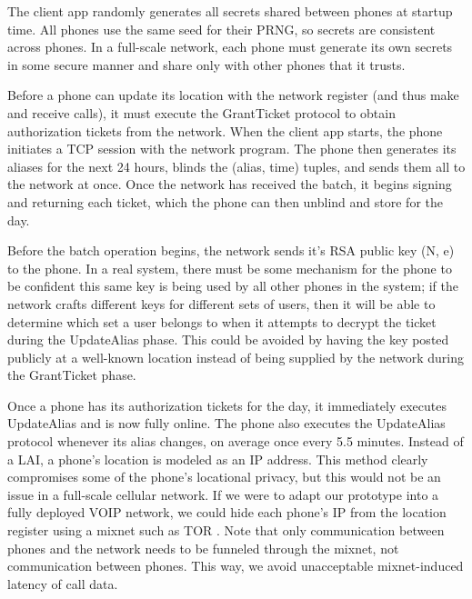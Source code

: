\documentclass[11pt]{article}
\begin{document}
The client app randomly generates all secrets shared between phones at startup time. All phones use the same seed for their PRNG, so secrets are consistent across phones. In a full-scale network, each phone must generate its own secrets in some secure manner and share only with other phones that it trusts.

Before a phone can update its location with the network register (and thus make and receive calls), it must execute the GrantTicket protocol to obtain authorization tickets from the network. When the client app starts, the phone initiates a TCP session with the network program.  The phone then generates its aliases for the next 24 hours, blinds the (alias, time) tuples, and sends them all to the network at once. Once the network has received the batch, it begins signing and returning each ticket, which the phone can then unblind and store for the day.

Before the batch operation begins, the network sends it's RSA public key (N, e) to the phone. In a real system, there must be some mechanism for the phone to be confident this same key is being used by all other phones in the system; if the network crafts different keys for different sets of users, then it will be able to determine which set a user belongs to when it attempts to decrypt the ticket during the UpdateAlias phase. This could be avoided by having the key posted publicly at a well-known location instead of being supplied by the network during the GrantTicket phase.

Once a phone has its authorization tickets for the day, it immediately executes UpdateAlias and is now fully online. The phone also executes the UpdateAlias protocol whenever its alias changes, on average once every 5.5 minutes. Instead of a LAI, a phone's location is modeled as an IP address. This method clearly compromises some of the phone's locational privacy, but this would not be an issue in a full-scale cellular network. If we were to adapt our prototype into a fully deployed VOIP network, we could hide each phone's IP from the location register using a mixnet such as TOR \cite{dingledine2004tor, goldschlag1999onion}. Note that only communication between phones and the network needs to be funneled through the mixnet, not communication between phones. This way, we avoid unacceptable mixnet-induced latency of call data. 
\end{document}
